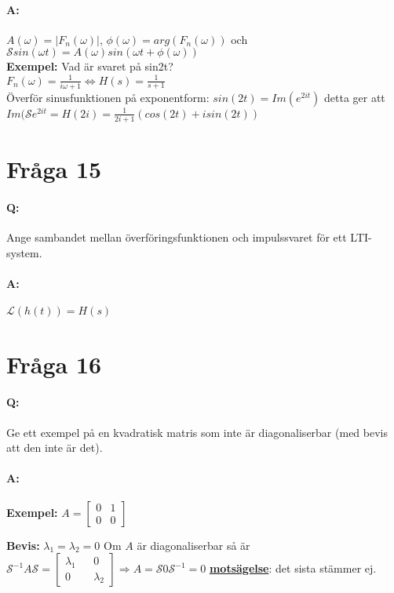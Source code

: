 \documentclass[a4paper]{article}
\begin{document}
\paragraph{A:} $A(\omega)=|F_n(\omega)|$, $\phi(\omega)=arg(F_n(\omega))$ och $\mathcal{S}sin(\omega t) = A(\omega)sin(\omega t + \phi(\omega))$ \\
\textbf{Exempel:} Vad är svaret på sin2t?\\$F_n(\omega) = \frac{1}{i\omega + 1} \Leftrightarrow H(s)=\frac{1}{s+1}$\\Överför sinusfunktionen på exponentform: $sin(2t) = Im(e^{2it})$ detta ger att $Im(\mathcal{S}e^{2it}=H(2i)=\frac{1}{2i+1}(cos(2t)+isin(2t))$

\section{Fråga 15}
\paragraph{Q:} Ange sambandet mellan överföringsfunktionen och impulssvaret för ett LTI-system.
\paragraph{A:} $\mathcal{L}(h(t)) = H(s)$ 

\section{Fråga 16}
\paragraph{Q:} Ge ett exempel på en kvadratisk matris som inte är diagonaliserbar (med bevis att den inte är det).
\paragraph{A:} \textbf{Exempel:} { \center
$A=
\begin{bmatrix}
0 & 1 \\
0 & 0
\end{bmatrix}
$ \center }

\textbf{Bevis:} $\lambda_1=\lambda_2=0$ Om $A$ är diagonaliserbar så är $\mathcal{S}^{-1}A\mathcal{S} = 
\begin{bmatrix}
\lambda_1 && 0 \\
0 && \lambda_2
\end{bmatrix}
\Rightarrow
A=\mathcal{S}0\mathcal{S}^{-1}=0$ \underline{\textbf{motsägelse}}: det sista stämmer ej.
\end{document}
